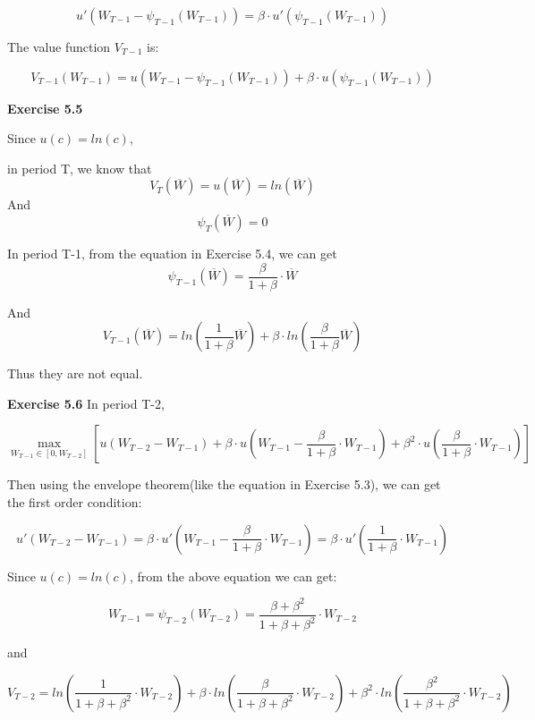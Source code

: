 \documentclass[letterpaper,12pt]{article}
\theoremstyle{definition}
\begin{document}
\begin{equation*}
u'(W_{T-1}-\psi_{T-1} (W_{T-1}))=\beta\cdot  u'( \psi_{T-1} (W_{T-1}) )
\end{equation*}

The value function $V_{T-1}$ is:

\begin{equation*}
V_{T-1}(W_{T-1}) = u(W_{T-1}-\psi_{T-1} (W_{T-1})) + \beta\cdot  u( \psi_{T-1} (W_{T-1}) )
\end{equation*}

\noindent\textbf{Exercise 5.5}

Since $u(c)=ln(c)$, 

in period T, we know that $$V_T(\overline{W}) = u(\overline{W})= ln(\overline{W})$$
And $$\psi_T (\overline{W}) = 0 $$

In period T-1, from the equation in Exercise 5.4, we can get $$\psi_{T-1} (\overline{W}) = \frac{\beta }{1+\beta }\cdot \overline{W}$$

And $$V_{T-1}(\overline{W}) = ln(\frac{1}{1+\beta }\overline{W})+\beta \cdot ln(\frac{\beta }{1+\beta }\overline{W})$$

Thus they are not equal.

\noindent\textbf{Exercise 5.6}
In period T-2,

\begin{equation*}
  \max_{W_{T-1}\in \left [ 0,W_{T-2} \right ]} \left [  u\left ( W_{T-2}-W_{T-1} \right )+\beta\cdot u\left ( W_{T-1}-\frac{\beta }{1+\beta }\cdot W_{T-1} \right )+\beta ^{2}\cdot u(\frac{\beta }{1+\beta }\cdot W_{T-1}  )\right ]
\end{equation*}


Then using the envelope theorem(like the equation in Exercise 5.3), we can get the first order condition:

\begin{equation*}
u'(W_{T-2}-W_{T-1})=\beta\cdot u'(W_{T-1}-\frac{\beta }{1+\beta }\cdot W_{T-1}) = \beta\cdot u'(\frac{1 }{1+\beta }\cdot W_{T-1})
\end{equation*}

Since $u(c)=ln(c)$, from the above equation we can get:

\begin{equation*}
  W_{T -1} = \psi_{T -2} (W_{T -2}) = \frac{\beta +\beta ^2}{1+\beta +\beta ^2}\cdot W_{T -2}
\end{equation*}

and

\begin{equation*}
V_{T-2}=ln( \frac{1}{1+\beta +\beta ^2}\cdot W_{T-2}) + \beta \cdot ln(\frac{\beta }{1+\beta +\beta ^2}\cdot W_{T -2})+ \beta^2 \cdot ln( \frac{\beta ^2}{1+\beta +\beta ^2}\cdot W_{T -2})
\end{equation*}
\end{document}
